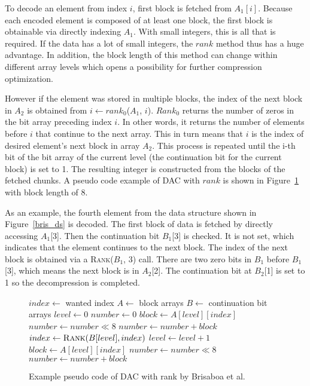 To decode an element from index $i$, first block is fetched from $A_1[i]$. Because each encoded element is composed of at least one block, the first block is obtainable via directly indexing $A_1$. 
With small integers, this is all that is required. If the data has a lot of small integers, the $rank$ method thus has a huge advantage. In addition, the block length of this method can change within 
different array levels which opens a possibility for further compression optimization. 

However if the element was stored in multiple blocks, the index of the next block in $A_2$ is obtained from $i \gets rank_0$($A_1$, $i$). $Rank_0$ 
returns the number of zeros in the bit array preceding index $i$. In other words, it returns the number of elements before $i$ that continue to the next array. 
This in turn means that $i$ is the index of desired element's next block in array $A_2$. This process is repeated until the i-th bit of the bit array of the current level (the continuation bit for the current 
block) is set to 1. The resulting integer is constructed from the blocks of the fetched chunks. A pseudo code example of DAC with $rank$ is shown in Figure~\ref{bris_pseudo} with block length of 8. 

As an example, the fourth element from the data structure shown in Figure~\ref{bris_ds} is decoded. The first block of data is fetched by directly accessing $A_1$[3]. Then the 
continuation bit $B_1$[3] is checked. It is not set, which indicates that the element continues to the next block. The index of the next block is obtained via a \textsc{Rank}($B_1$, 3) call. There are two zero 
bits in $B_1$ before $B_1$[3], which means the next block is in $A_2$[2]. The continuation bit at $B_2$[1] is set to 1 so the decompression is completed.

\begin{figure}[ht]
\centering
\begin{minipage}{0.5\linewidth}
\begin{algorithmic}
\State $index \gets $ wanted index
\State $A \gets $ block arrays
\State $B \gets $ continuation bit arrays
\State $level \gets 0$
\State $number \gets 0$
\State $block \gets A[level][index]$
\State $number \gets number \mathbin{\ll} 8$
\State $number \gets number + block$
\State $index \gets \Call{Rank}{B[level], index}$
\State $level \gets level + 1$
\EndWhile
\State $block \gets A[level][index]$
\State $number \gets number \mathbin{\ll} 8$
\State $number \gets number + block$
\end{algorithmic}
\end{minipage}
\caption{Example pseudo code of DAC with rank by Brisaboa et al.} \label{bris_pseudo}

\end{figure}

